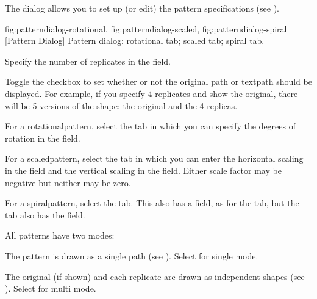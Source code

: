 
The  dialog allows you to set up (or edit) the pattern
specifications (see ).

{
  {fig:patterndialog-rotational}{}{},
  {fig:patterndialog-scaled}{}{},
  {fig:patterndialog-spiral}{}{}
}
[Pattern Dialog]
{Pattern dialog:
 rotational tab;
 scaled tab;
 spiral tab.}


Specify the number of replicates in the  field.


Toggle the   checkbox to set whether
or not the original \gls*{path} or \gls*{textpath} should be
displayed. For example, if you specify 4 replicates and show the
original, there will be 5 versions of the shape: the original and
the 4 replicas.


For a \gls{rotationalpattern}, select the
 tab in which you can specify the degrees
of rotation in the  field.


For a \gls{scaledpattern}, select the  tab
in which you can enter the horizontal scaling in the
 field and the vertical scaling in 
the  field.
Either scale factor may be negative but neither may be zero.


For a \gls{spiralpattern}, select the  tab.
This also has a  field, as for the
 tab, but the  tab
also has the  field.


All patterns have two modes:
\begin{deflist}
\begin{itemdesc}
The pattern is drawn as a single path (see ).
Select  for single mode.
\end{itemdesc}

\begin{itemdesc}
The original (if shown) and each replicate are drawn as 
independent shapes (see ).
Select  for multi mode.
\end{itemdesc}

\end{deflist}

